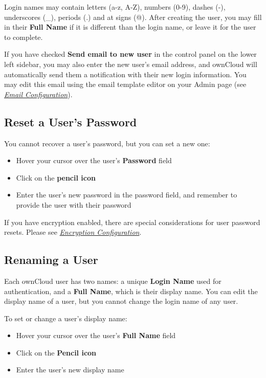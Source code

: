 \documentclass[letterpaper,10pt,english]{sphinxmanual}
\begin{document}
Login names may contain letters (a-z, A-Z), numbers (0-9), dashes (-),
underscores (\_), periods (.) and at signs (@). After creating the user, you
may fill in their \textbf{Full Name} if it is different than the login name, or
leave it for the user to complete.

If you have checked \textbf{Send email to new user} in the control panel on the
lower left sidebar, you may also enter the new user's email address, and
ownCloud will automatically send them a notification with their new login
information. You may edit this email using the email template editor on your
Admin page (see {\hyperref[configuration_server/email_configuration::doc]{\emph{Email Configuration}}}).


\subsection{Reset a User's Password}
\label{configuration_user/user_configuration:reset-a-user-s-password}
You cannot recover a user's password, but you can set a new one:
\begin{itemize}
\item {} 
Hover your cursor over the user's \textbf{Password} field

\item {} 
Click on the \textbf{pencil icon}

\item {} 
Enter the user's new password in the password field, and remember to provide
the user with their password

\end{itemize}

If you have encryption enabled, there are special considerations for user
password resets. Please see
{\hyperref[configuration_files/encryption_configuration::doc]{\emph{Encryption Configuration}}}.


\subsection{Renaming a User}
\label{configuration_user/user_configuration:renaming-a-user}
Each ownCloud user has two names: a unique \textbf{Login Name} used for
authentication, and a \textbf{Full Name}, which is their display name. You can edit
the display name of a user, but you cannot change the login name of any user.

To set or change a user's display name:
\begin{itemize}
\item {} 
Hover your cursor over the user's \textbf{Full Name} field

\item {} 
Click on the \textbf{Pencil icon}

\item {} 
Enter the user's new display name

\end{itemize}
\end{document}
